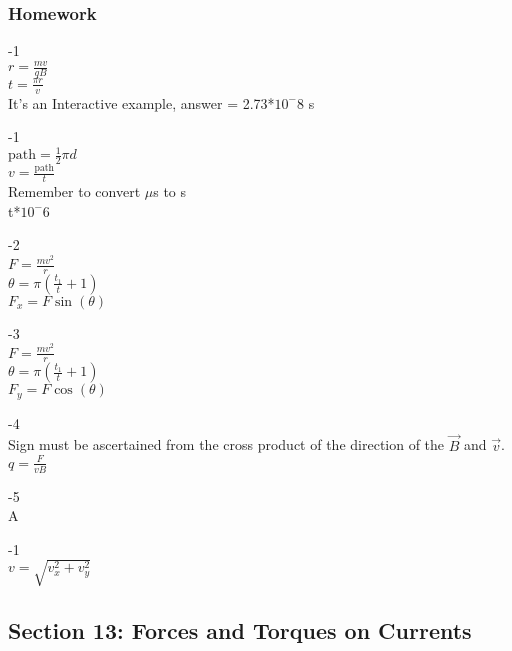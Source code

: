 \documentclass{article}
\begin{document}
\subsubsection{Homework}
-1 \\
$r = \frac{mv}{qB}$ \\ 
$t = \frac{\pi r}{v}$ \\
It's an Interactive example, answer = 2.73*$10^-8$ s

\vspace{2mm}

-1 \\
$\text{path} = \frac{1}{2}\pi d $ \\
$v =  \frac{\text{path}}{t} $ \\
Remember to convert $\mu$s to s \\
t*$10^-6$

\vspace{2mm}

-2 \\
$F =\frac{mv^2}{r} $ \\
$\theta  = \pi\left( \frac{t_{1}}{t}+1 \right) $ \\
$F_x =F \sin(\theta)$ 

\vspace{2mm}

-3 \\
$F =\frac{mv^2}{r}$\\
$\theta  = \pi\left( \frac{t_{1}}{t}+1 \right) $ \\
$F_y =F \cos(\theta)$ 

\vspace{2mm}

-4 \\
Sign must be ascertained from the cross product of the direction of the $\vec{B}$ and $\vec{v}$. \\
$q = \frac{F}{vB}$ 

\vspace{2mm}

-5 \\
A

\vspace{2mm}

-1 \\
$v = \sqrt{v_x^2 + v_y^2}$


\vspace{2mm}
\subsection{Section 13: Forces and Torques on Currents}
\end{document}
